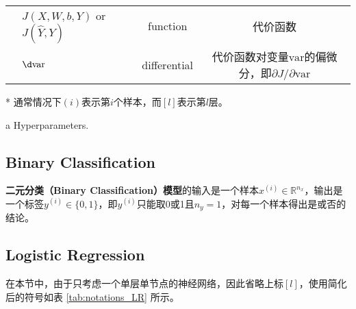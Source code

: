 \begin{table}[htb!]
\begin{threeparttable}
\begin{tabular}{clcc}
                                    & $J(X,W,b,Y)$ or $J(\hat{Y},Y)$                        & function             & 代价函数                                                                        \\
                                    & $\d \mathrm{var}$                                     & differential         & 代价函数对变量$\mathrm{var}$的偏微分，即${\partial J}/{\partial \mathrm{var}}$ \\
        \bottomrule
    \end{tabular}
    \label{tab:notations-chap1} %
    \begin{tablenotes}
        \item[*] 通常情况下$(i)$表示第$i$个样本，而$[l]$表示第$l$层。
        \item[a] Hyperparameters.
    \end{tablenotes}
    \end{threeparttable}
\end{table}

\subsection{Binary Classification}
\textbf{二元分类（Binary Classification）模型}的输入是一个样本$x^{(i)} \in \mathbb{R}^{n_x}$，输出是一个标签$y^{(i)} \in \{0, 1\}$，即$y^{(i)}$只能取0或1且$n_y=1$，对每一个样本得出是或否的结论。

\subsection{Logistic Regression}

在本节中，由于只考虑一个单层单节点的神经网络，因此省略上标$[l]$，使用简化后的符号如表 \ref{tab:notations_LR} 所示。

